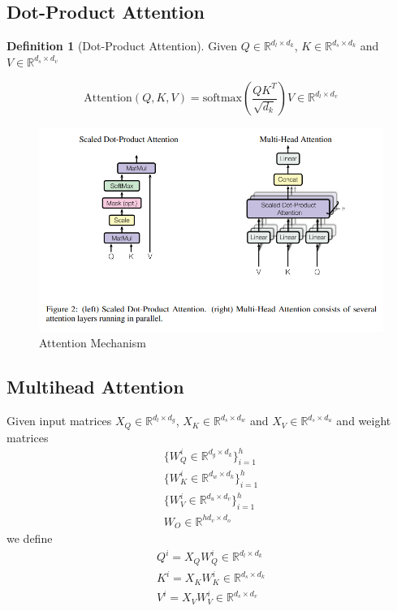 \documentclass[11pt]{article}
\theoremstyle{definition}
\newtheorem{definition}{Definition}[section]
\begin{document}
\subsection{Dot-Product Attention}

\begin{definition}[Dot-Product Attention] Given $Q \in \mathbb{R}^{d_l \times d_k}$, $K \in \mathbb{R}^{d_s \times d_k}$ and $V \in \mathbb{R}^{d_s \times d_v}$

\begin{equation}
\mathrm{Attention} \left( Q,K,V \right) = \mathrm{softmax} \left( \frac{QK^T}{\sqrt{d_k}} \right) V \in \mathbb{R}^{d_l \times d_v}
\end{equation}
\end{definition}

\begin{figure}
\centering
  \includegraphics[width=\textwidth,height=\textheight,keepaspectratio]{transformers/attention_mechanism.png}
  \caption{Attention Mechanism \cite{vaswani2017attention}}
  \label{fig:attention}
\end{figure}

\subsection{Multihead Attention}
Given input matrices $X_Q \in \mathbb{R}^{d_l \times d_g}$, $X_K \in \mathbb{R}^{d_s \times d_w}$ and $X_V \in \mathbb{R}^{d_s \times d_u}$ and weight matrices
\begin{gather}
\nonumber \{W_Q^i \in \mathbb{R}^{d_g \times d_k} \}_{i=1}^h \\
\{W_K^i \in \mathbb{R}^{d_w \times d_k} \}_{i=1}^h \\
\nonumber \{W_V^i \in \mathbb{R}^{d_u \times d_v} \}_{i=1}^h \\
W_O \in \mathbb{R}^{hd_v \times d_o}
\end{gather}
we define
\begin{gather}
\nonumber Q^i = X_QW_Q^i \in \mathbb{R}^{d_l \times d_k} \\
K^i = X_KW_K^i \in \mathbb{R}^{d_s \times d_k} \\
\nonumber V^i = X_VW_V^i \in \mathbb{R}^{d_s \times d_v}
\end{gather}
\end{document}
